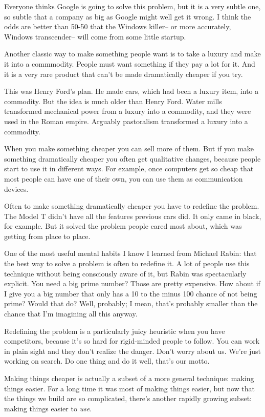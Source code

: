 Everyone thinks Google is going to solve this problem, but it is a very
subtle one, so subtle that a company as big as Google might well get it
wrong. I think the odds are better than 50-50 that the Windows killer--
or more accurately, Windows transcender-- will come from some little
startup.

Another classic way to make something people want is to take a luxury
and make it into a commmodity. People must want something if they pay a
lot for it. And it is a very rare product that can't be made
dramatically cheaper if you try.

This was Henry Ford's plan. He made cars, which had been a luxury item,
into a commodity. But the idea is much older than Henry Ford. Water
mills transformed mechanical power from a luxury into a commodity, and
they were used in the Roman empire. Arguably pastoralism transformed a
luxury into a commodity.

When you make something cheaper you can sell more of them. But if you
make something dramatically cheaper you often get qualitative changes,
because people start to use it in different ways. For example, once
computers get so cheap that most people can have one of their own, you
can use them as communication devices.

Often to make something dramatically cheaper you have to redefine the
problem. The Model T didn't have all the features previous cars did. It
only came in black, for example. But it solved the problem people cared
most about, which was getting from place to place.

One of the most useful mental habits I know I learned from Michael
Rabin: that the best way to solve a problem is often to redefine it. A
lot of people use this technique without being consciously aware of it,
but Rabin was spectacularly explicit. You need a big prime number? Those
are pretty expensive. How about if I give you a big number that only has
a 10 to the minus 100 chance of not being prime? Would that do? Well,
probably; I mean, that's probably smaller than the chance that I'm
imagining all this anyway.

Redefining the problem is a particularly juicy heuristic when you have
competitors, because it's so hard for rigid-minded people to follow. You
can work in plain sight and they don't realize the danger. Don't worry
about us. We're just working on search. Do one thing and do it well,
that's our motto.

Making things cheaper is actually a subset of a more general technique:
making things easier. For a long time it was most of making things
easier, but now that the things we build are so complicated, there's
another rapidly growing subset: making things easier to \emph{use}.

